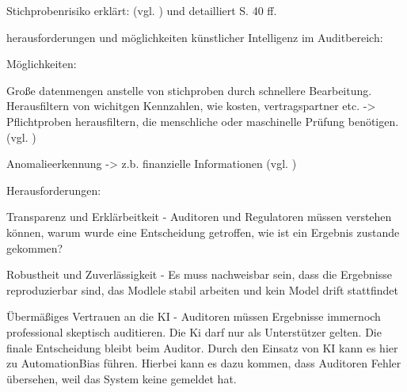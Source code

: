 

Stichprobenrisiko erklärt: (vgl. \cite[S.12]{baumeister2019sample}) und detailliert S. 40 ff.


herausforderungen und möglichkeiten künstlicher Intelligenz im Auditbereich:

Möglichkeiten:

Große datenmengen anstelle von stichproben durch schnellere Bearbeitung.
Herausfiltern von wichitgen Kennzahlen, wie kosten, vertragspartner etc.
-> Pflichtproben herausfiltern, die menschliche oder maschinelle Prüfung benötigen.
(vgl. \autocite[S.3]{KOKINA2025100734})

Anomalieerkennung -> z.b. finanzielle Informationen (vgl. \autocite[S.2]{KOKINA2025100734})

Herausforderungen:

Transparenz und Erklärbeitkeit - Auditoren und Regulatoren müssen verstehen können, warum wurde eine Entscheidung getroffen, wie ist ein Ergebnis zustande gekommen? \autocite[S.16]{KOKINA2025100734}

Robustheit und Zuverlässigkeit - Es muss nachweisbar sein, dass die Ergebnisse reproduzierbar sind, das Modlele stabil arbeiten und kein Model drift stattfindet 
\autocite[S. 13 f.]{KOKINA2025100734}

Übermäßiges Vertrauen an die KI - Auditoren müssen Ergebnisse immernoch professional skeptisch auditieren. Die Ki darf nur als Unterstützer gelten. Die finale Entscheidung bleibt beim Auditor. Durch den Einsatz von KI kann es hier zu AutomationBias führen. Hierbei kann es dazu kommen, dass Auditoren Fehler übersehen, weil das System keine gemeldet hat. \autocite[S.425 f.]{lyell2017automation}

